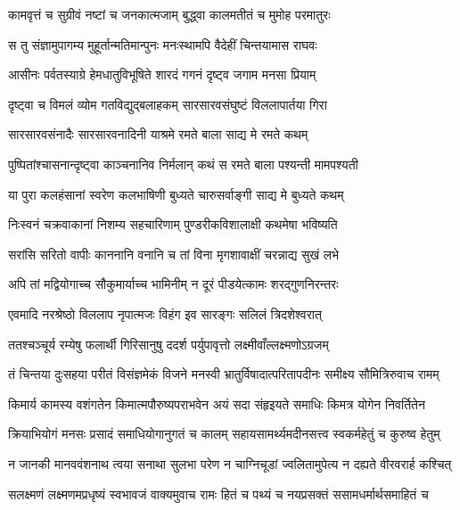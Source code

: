 \twolineshloka
{कामवृत्तं च सुग्रीवं नष्टां च जनकात्मजाम्}
{बुद्ध्वा कालमतीतं च मुमोह परमातुरः} %

\twolineshloka
{स तु संज्ञामुपागम्य मुहूर्तान्मतिमान्पुनः}
{मनःस्थामपि वैदेहीं चिन्तयामास राघवः} %

\twolineshloka
{आसीनः पर्वतस्याग्रे हेमधातुविभूषिते}
{शारदं गगनं दृष्ट्व जगाम मनसा प्रियाम्} %

\twolineshloka
{दृष्ट्वा च विमलं व्योम गतविद्युद्बलाहकम्}
{सारसारवसंघुष्टं विललापार्तया गिरा} %

\twolineshloka
{सारसारवसंनादैः सारसारवनादिनी}
{याश्रमे रमते बाला साद्य मे रमते कथम्} %

\twolineshloka
{पुष्पितांश्चासनान्दृष्ट्वा काञ्चनानिव निर्मलान्}
{कथं स रमते बाला पश्यन्ती मामपश्यती} %

\twolineshloka
{या पुरा कलहंसानां स्वरेण कलभाषिणी}
{बुध्यते चारुसर्वाङ्गी साद्य मे बुध्यते कथम्} %

\twolineshloka
{निःस्वनं चक्रवाकानां निशम्य सहचारिणाम्}
{पुण्डरीकविशालाक्षी कथमेषा भविष्यति} %

\twolineshloka
{सरांसि सरितो वापीः काननानि वनानि च}
{तां विना मृगशावाक्षीं चरन्नाद्य सुखं लभे} %

\twolineshloka
{अपि तां मद्वियोगाच्च सौकुमार्याच्च भामिनीम्}
{न दूरं पीडयेत्कामः शरद्गुणनिरन्तरः} %

\twolineshloka
{एवमादि नरश्रेष्ठो विललाप नृपात्मजः}
{विहंग इव सारङ्गः सलिलं त्रिदशेश्वरात्} %

\twolineshloka
{ततश्चञ्चूर्य रम्येषु फलार्थी गिरिसानुषु}
{ददर्श पर्युपावृत्तो लक्ष्मीवाँल्लक्ष्मणोऽग्रजम्} %

\fourlineindentedshloka
{तं चिन्तया दुःसहया परीतं}
{ विसंज्ञमेकं विजने मनस्वी}
{भ्रातुर्विषादात्परितापदीनः}
{ समीक्ष्य सौमित्रिरुवाच रामम्} %

\fourlineindentedshloka
{किमार्य कामस्य वशंगतेन}
{ किमात्मपौरुष्यपराभवेन}
{अयं सदा संहृइयते समाधिः}
{ किमत्र योगेन निवर्तितेन} %

\fourlineindentedshloka
{क्रियाभियोगं मनसः प्रसादं}
{ समाधियोगानुगतं च कालम्}
{सहायसामर्थ्यमदीनसत्त्व}
{ स्वकर्महेतुं च कुरुष्व हेतुम्} %

\fourlineindentedshloka
{न जानकी मानववंशनाथ}
{ त्वया सनाथा सुलभा परेण}
{न चाग्निचूडां ज्वलितामुपेत्य}
{ न दह्यते वीरवरार्ह कश्चित्} %

\fourlineindentedshloka
{सलक्ष्मणं लक्ष्मणमप्रधृष्यं}
{ स्वभावजं वाक्यमुवाच रामः}
{हितं च पथ्यं च नयप्रसक्तं}
{ ससामधर्मार्थसमाहितं च} %

